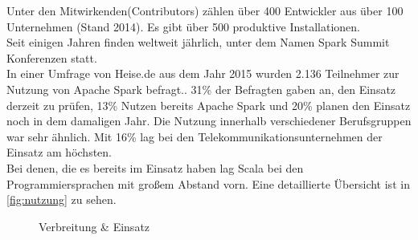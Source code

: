 \noindent
Unter den Mitwirkenden(Contributors) zählen über 400 Entwickler aus über 100 Unternehmen (Stand 2014). Es gibt über 500 produktive Installationen. \cite{ADD+15} \\ %

\noindent
Seit einigen Jahren finden weltweit jährlich, unter dem Namen \glqq{}Spark Summit\grqq{} Konferenzen statt.\cite{SPCOM}\\



\noindent
In einer Umfrage von Heise.de aus dem Jahr 2015 wurden 2.136 Teilnehmer zur Nutzung von Apache Spark befragt.\cite{HEISEBIGDATA}. 31\% der Befragten gaben an, den Einsatz derzeit zu prüfen, 13\% Nutzen bereits Apache Spark und 20\% planen den Einsatz noch in dem damaligen Jahr. Die Nutzung innerhalb verschiedener Berufsgruppen war sehr ähnlich. Mit 16\%  lag bei den Telekommunikationsunternehmen der Einsatz am höchsten.\\
Bei denen, die es bereits im Einsatz haben lag Scala bei den Programmiersprachen mit großem Abstand vorn. Eine detaillierte Übersicht ist in \autoref{fig:nutzung} zu sehen.
\begin{figure}[h]
  \centering
  \caption{Verbreitung \& Einsatz}\label{fig:nutzung}
\end{figure}
